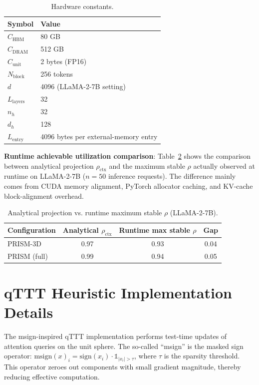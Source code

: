 \documentclass[11pt,a4paper]{article}
\theoremstyle{plain}
\theoremstyle{definition}
\begin{document}
\begin{table}[htbp]
\centering
\caption{Hardware constants.}
\label{tab:hardware}
\begin{tabular}{ll}
\toprule
\textbf{Symbol} & \textbf{Value} \\
\midrule
$C_{\text{HBM}}$ & 80 GB \\
$C_{\text{DRAM}}$ & 512 GB \\
$C_{\text{unit}}$ & 2 bytes (FP16) \\
$N_{\text{block}}$ & 256 tokens \\
$d$ & 4096 (LLaMA-2-7B setting) \\
$L_{\text{layers}}$ & 32 \\
$n_h$ & 32 \\
$d_h$ & 128 \\
$L_{\text{entry}}$ & 4096 bytes per external-memory entry \\
\bottomrule
\end{tabular}
\end{table}

\textbf{Runtime achievable utilization comparison}: Table~\ref{tab:runtime-rho} shows the comparison between analytical projection $\rho_{\text{ctx}}$ and the maximum stable $\rho$ actually observed at runtime on LLaMA-2-7B ($n=50$ inference requests). The difference mainly comes from CUDA memory alignment, PyTorch allocator caching, and KV-cache block-alignment overhead.

\begin{table}[htbp]
\centering
\caption{Analytical projection vs. runtime maximum stable $\rho$ (LLaMA-2-7B).}
\label{tab:runtime-rho}
\begin{tabular}{lccc}
\toprule
\textbf{Configuration} & \textbf{Analytical $\rho_{\text{ctx}}$} & \textbf{Runtime max stable $\rho$} & \textbf{Gap} \\
\midrule
PRISM-3D & 0.97 & 0.93 & 0.04 \\
PRISM (full) & 0.99 & 0.94 & 0.05 \\
\bottomrule
\end{tabular}
\end{table}

\section{qTTT Heuristic Implementation Details}\label{app:qttt}

The msign-inspired qTTT implementation performs test-time updates of attention queries on the unit sphere. The so-called ``msign'' is the masked sign operator: $\text{msign}(x)_i = \text{sign}(x_i) \cdot \mathbb{1}_{|x_i| > \tau}$, where $\tau$ is the sparsity threshold. This operator zeroes out components with small gradient magnitude, thereby reducing effective computation.
\end{document}
